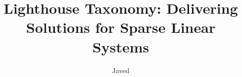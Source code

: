 \documentclass[defaultstyle,11pt]{thesis}
\title{Lighthouse Taxonomy: Delivering Solutions for Sparse Linear Systems}
\author{Javed}{Hossain}
\begin{document}









\nocite{*}			%

\appendix

\end{document}
